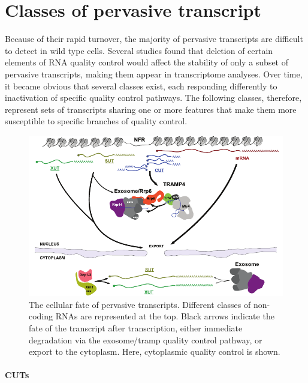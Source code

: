 \section{Classes of pervasive transcript} \label{pervasiveTranscripts}

Because of their rapid turnover, the majority of pervasive transcripts are difficult to detect in wild type cells. 
Several studies found that deletion of certain elements of RNA quality control would affect the stability of only a subset of pervasive transcripts, making them appear in transcriptome analyses. 
Over time, it became obvious that several classes exist, each responding differently to inactivation of specific quality control pathways. 
The following classes, therefore, represent sets of transcripts sharing one or more features that make them more susceptible to specific branches of quality control.

\begin{figure}[ht]

\centering
\includegraphics[width=\textwidth]{figures/introduction/pervasiveTr}
\caption[Classes of transcripts and their fates.]{The cellular fate of pervasive transcripts. Different classes of non-coding RNAs are represented at the top. Black arrows indicate the fate of the transcript after transcription, either immediate degradation via the exosome/\gls{tramp} quality control pathway, or export to the cytoplasm. Here, cytoplasmic quality control is shown.}
\label{fig:nnsTermination}

\end{figure}


\paragraph{CUTs}

